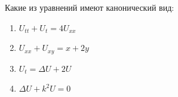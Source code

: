 Какие из уравнений имеют канонический вид:

\begin{enumerate}[label=\arabic*)]
    \item \(U_{tt}+U_t=4U_{xx}\)
    \item \(U_{xx}+U_{xy}=x+2y\)
    \item \(U_t=\Delta U+2U\)
    \item \(\Delta U+k^2U=0\)
\end{enumerate}

